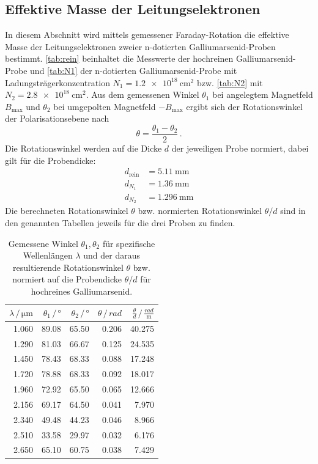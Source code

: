 \subsection{Effektive Masse der Leitungselektronen}
In diesem Abschnitt wird mittels gemessener Faraday-Rotation die effektive Masse der Leitungselektronen zweier n-dotierten Galliumarsenid-Proben bestimmt.
\autoref{tab:rein} beinhaltet die Messwerte der hochreinen Galliumarsenid-Probe und \autoref{tab:N1} der n-dotierten Galliumarsenid-Probe mit Ladungsträgerkonzentration $N_1 = \qty{1.2e18}{\centi\metre^2}$ bzw. \autoref{tab:N2} mit $N_2 = \qty{2.8e18}{\centi\metre^2}$.
Aus dem gemessenen Winkel $\theta_1$ bei angelegtem Magnetfeld $B_\text{max}$ und $\theta_2$ bei umgepolten Magnetfeld $-B_\text{max}$ ergibt sich der Rotationswinkel der Polarisationsebene nach
\begin{equation*}
    \theta = \frac{\theta_1 - \theta_2}{2} \, .
\end{equation*}
Die Rotationswinkel werden auf die Dicke $d$ der jeweiligen Probe normiert, dabei gilt für die Probendicke:
\begin{align}
    d_\text{rein} &= \qty{5.11}{\milli\metre} \\
    d_{N_1} &= \qty{1.36}{\milli\metre} \\
    d_{N_2} &= \qty{1.296}{\milli\metre}
\end{align}
Die berechneten Rotationswinkel $\theta$ bzw. normierten Rotationswinkel $\theta / d$ sind in den genannten Tabellen jeweils für die drei Proben zu finden.\\
\begin{table}
    \centering
    \caption{Gemessene Winkel $\theta_1, \theta_2$ für spezifische Wellenlängen $\lambda$ und der daraus resultierende Rotationswinkel $\theta$ bzw. normiert auf die Probendicke $\theta/d$ für hochreines Galliumarsenid.}
    \label{tab:rein}
    \begin{tabular}{r r r r r}
        \toprule
        $\lambda \,/\, \unit{\micro\metre}$ & $\theta_1 \,/\, \unit{\degree}$ & $\theta_2 \,/\, \unit{\degree}$ & $\theta \,/\, \unit{rad}$ & $\frac{\theta}{d} \,/\, \frac{rad}{\unit{\metre}}$ \\
        \midrule
        1.060 & 89.08 & 65.50 & 0.206 & 40.275 \\
        1.290 & 81.03 & 66.67 & 0.125 & 24.535 \\
        1.450 & 78.43 & 68.33 & 0.088 & 17.248 \\
        1.720 & 78.88 & 68.33 & 0.092 & 18.017 \\
        1.960 & 72.92 & 65.50 & 0.065 & 12.666 \\
        2.156 & 69.17 & 64.50 & 0.041 & 7.970 \\
        2.340 & 49.48 & 44.23 & 0.046 & 8.966 \\
        2.510 & 33.58 & 29.97 & 0.032 & 6.176 \\
        2.650 & 65.10 & 60.75 & 0.038 & 7.429 \\
        \bottomrule
    \end{tabular}
\end{table}
